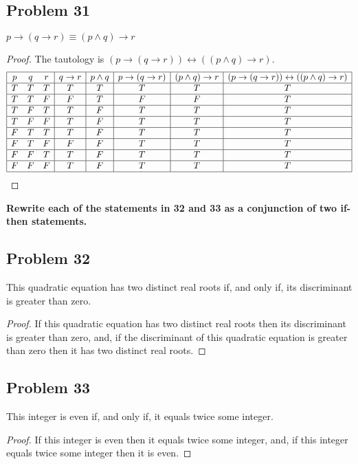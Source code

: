 \documentclass[14pt]{extarticle}
\newcommand{\bic}{\leftrightarrow}
\begin{document}
\subsection{Problem 31}
$p \to (q \to r) \equiv (p \wedge q) \to r$

\begin{proof}
The tautology is $(p \to (q \to r)) \bic ((p \wedge q) \to r)$.
$$
\begin{array}{|ccc|c|c|c|c|c|}
\hline
p & q & r & q \to r & p \wedge q & p \to (q \to r) & (p \wedge q) \to r & (p \to (q \to r)) \bic ((p \wedge q) \to r) \\
\hline
T & T & T & T & T & T & T & T \\
\hline
T & T & F & F & T & F & F & T \\
\hline
T & F & T & T & F & T & T & T \\
\hline
T & F & F & T & F & T & T & T \\
\hline
F & T & T & T & F & T & T & T \\
\hline
F & T & F & F & F & T & T & T \\
\hline
F & F & T & T & F & T & T & T \\
\hline
F & F & F & T & F & T & T & T \\
\hline
\end{array}
$$
\end{proof}

{\bf Rewrite each of the statements in 32 and 33 as a conjunction of two if-then statements.}

\subsection{Problem 32}
This quadratic equation has two distinct real roots if, and only if, its discriminant is greater than zero.

\begin{proof}
If this quadratic equation has two distinct real roots then its discriminant is greater than zero, and, if the discriminant of this quadratic equation is greater than zero then it has two distinct real roots.
\end{proof}

\subsection{Problem 33}
This integer is even if, and only if, it equals twice some integer.

\begin{proof}
If this integer is even then it equals twice some integer, and, if this integer equals twice some integer then it is even.
\end{proof}
\end{document}
